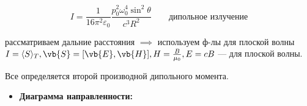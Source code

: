 \begin{nb}
	\begin{equation}
		I = \frac{1}{16\pi^2\varepsilon_0} \frac{p_0^2 \omega_0^4 \sin^2\theta}{c^3 R^2} \qquad \text{дипольное излучение}
	\end{equation}
\end{nb}
рассматриваем дальние расстояния $\implies$ используем ф-лы для плоской волны $I = \langle S \rangle_T, \vb{S} = [\vb{E}, \vb{H}], H = \frac{B}{\mu_0}, E=cB$ --- для плоской волны.

Все определяется второй производной дипольного момента.

\begin{itemize}
	\item \textbf{Диаграмма направленности:}
	\begin{figure}[H]
		\centering
	\end{figure}
\end{itemize}